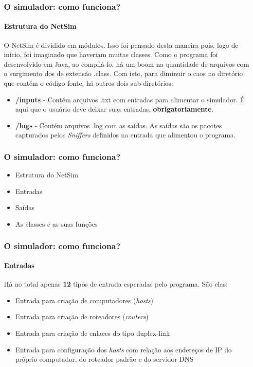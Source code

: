 \documentclass{beamer}
\begin{document}
\begin{frame}
	\frametitle{O simulador: como funciona?}
	\framesubtitle{Estrutura do NetSim}
	O NetSim é dividido em módulos. Isso foi pensado desta maneira pois, logo de inicio, 
	foi imaginado que haveriam muitas classes. Como o programa foi desenvolvido em Java, ao compilá-lo, 
	há um boom na quantidade de arquivos com o surgimento dos de extensão .class. 
	Com isto, para diminuir o caos no diretório que contém o código-fonte, há outros
	dois sub-diretórios:
	\begin{itemize}
		\item \textbf{/inputs} - Contém arquivos .txt com entradas para alimentar o simulador. É aqui que o usuário deve deixar suas entradas, \textbf{obrigatoriamente}.
		\item \textbf{/logs} - Contém arquivos .log com as saídas. As saídas são os pacotes capturados pelos \textit{Sniffers} definidos na entrada que alimentou o programa.
	\end{itemize}
\end{frame}

\begin{frame}
	\frametitle{O simulador: como funciona?}
	\begin{itemize}
		\item \textcolor{covered}{Estrutura do NetSim}
		\item Entradas
		\item Saídas
		\item As classes e as suas funções
	\end{itemize}
\end{frame}

\begin{frame}
	\frametitle{O simulador: como funciona?}
	\framesubtitle{Entradas}
	Há no total apenas \textbf{12} tipos de entrada esperadas pelo programa. São elas:
	\begin{itemize}
		\item Entrada para criação de computadores (\textit{hosts})
		\item Entrada para criação de roteadores (\textit{routers})
		\item Entrada para criação de enlaces do tipo duplex-link
		\item Entrada para configuração dos \textit{hosts} com relação aos endereços de IP do próprio computador, do roteador padrão e do servidor DNS
	\end{itemize}
\end{frame}
\end{document}

